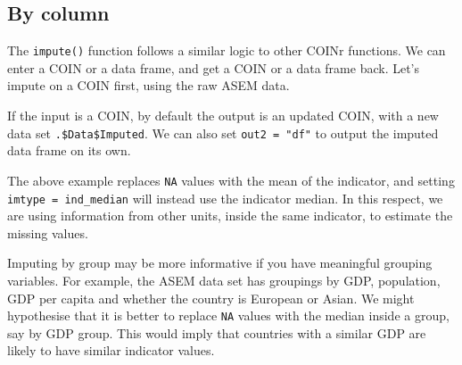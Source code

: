 \documentclass[
]{book}
\newenvironment{Shaded}{\begin{snugshade}}{\end{snugshade}}
\newcommand{\AttributeTok}[1]{\textcolor[rgb]{0.77,0.63,0.00}{#1}}
\newcommand{\CommentTok}[1]{\textcolor[rgb]{0.56,0.35,0.01}{\textit{#1}}}
\newcommand{\DocumentationTok}[1]{\textcolor[rgb]{0.56,0.35,0.01}{\textbf{\textit{#1}}}}
\newcommand{\FunctionTok}[1]{\textcolor[rgb]{0.00,0.00,0.00}{#1}}
\newcommand{\NormalTok}[1]{#1}
\newcommand{\OtherTok}[1]{\textcolor[rgb]{0.56,0.35,0.01}{#1}}
\newcommand{\SpecialCharTok}[1]{\textcolor[rgb]{0.00,0.00,0.00}{#1}}
\newcommand{\StringTok}[1]{\textcolor[rgb]{0.31,0.60,0.02}{#1}}
\begin{document}
\hypertarget{by-column}{%
\subsection{By column}\label{by-column}}

The \texttt{impute()} function follows a similar logic to other COINr functions. We can enter a COIN or a data frame, and get a COIN or a data frame back. Let's impute on a COIN first, using the raw ASEM data.

\begin{Shaded}
\end{Shaded}

If the input is a COIN, by default the output is an updated COIN, with a new data set \texttt{.\$Data\$Imputed}. We can also set \texttt{out2\ =\ "df"} to output the imputed data frame on its own.

The above example replaces \texttt{NA} values with the mean of the indicator, and setting \texttt{imtype\ =\ ind\_median} will instead use the indicator median. In this respect, we are using information from other units, inside the same indicator, to estimate the missing values.

Imputing by group may be more informative if you have meaningful grouping variables. For example, the ASEM data set has groupings by GDP, population, GDP per capita and whether the country is European or Asian. We might hypothesise that it is better to replace \texttt{NA} values with the median inside a group, say by GDP group. This would imply that countries with a similar GDP are likely to have similar indicator values.
\end{document}
